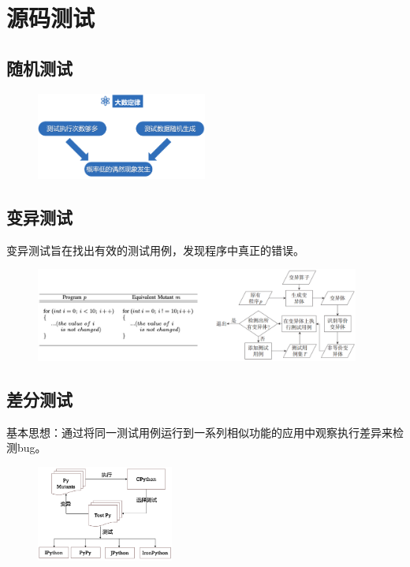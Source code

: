 \section{源码测试}

\subsection{随机测试}
\begin{figure}[H]
    \vspace{-0.5em}
	\centering
	\includegraphics[width=0.5\textwidth]{images/随机测试.png}
    \vspace{-1em}
\end{figure}

\subsection{变异测试}
变异测试旨在找出有效的测试用例，发现程序中真正的错误。
\begin{figure}[H]
    \vspace{-0.5em}
	\centering
	\includegraphics[width=0.95\textwidth]{images/变异测试.png}
    \vspace{-1em}
\end{figure}

\subsection{差分测试}
基本思想：通过将同一测试用例运行到一系列相似功能的应用中观察执行差异来检测bug。
\begin{figure}[H]
    \vspace{-0.5em}
	\centering
	\includegraphics[width=0.4\textwidth]{images/差分测试.png}
    \vspace{-1em}
\end{figure}

